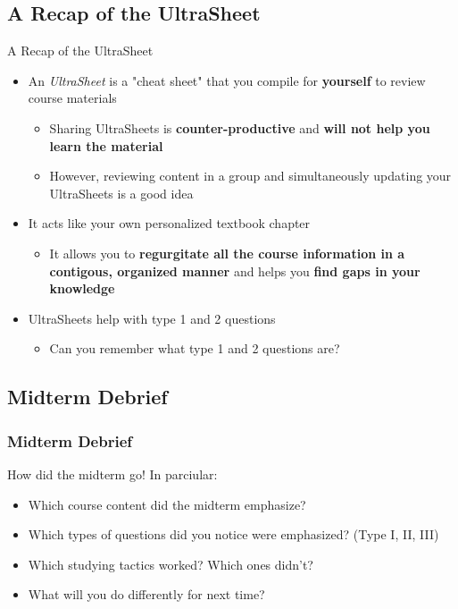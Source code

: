 \documentclass[hyperref={colorlinks,citecolor=blue,linkcolor=blue,urlcolor=blue}]{beamer}
\begin{document}
\subsection{A Recap of the UltraSheet\texttrademark{}}
\begin{frame}{A Recap of the UltraSheet\texttrademark{}}
  \begin{itemize}
    \item An \textit{UltraSheet\texttrademark{}} is a "cheat sheet" that you compile for \textbf{yourself} to review course materials 
    \begin{itemize}
      \item Sharing UltraSheets\texttrademark{} is \textbf{counter-productive} and \textbf{will not help you learn the material}
      \item However, reviewing content in a group and simultaneously updating your UltraSheets\texttrademark{} is a good idea
    \end{itemize}
    \item It acts like your own personalized textbook chapter
    \begin{itemize}
      \item It allows you to \textbf{regurgitate all the course information in a contigous, organized manner} and helps you \textbf{find gaps in your knowledge}
    \end{itemize}
    \item UltraSheets\texttrademark{} help with type 1 and 2 questions 
    \begin{itemize}
      \item Can you remember what type 1 and 2 questions are?
    \end{itemize}
  \end{itemize}

\end{frame}

\subsection{Midterm Debrief}
\begin{frame}
  \frametitle{Midterm Debrief}
  How did the midterm go! In parciular:
  \begin{itemize}
    \item Which course content did the midterm emphasize?
    \item Which types of questions did you notice were emphasized? (Type I, II, III)
    \item Which studying tactics worked? Which ones didn't?
    \item What will you do differently for next time?
  \end{itemize}
\end{frame}
\end{document}
